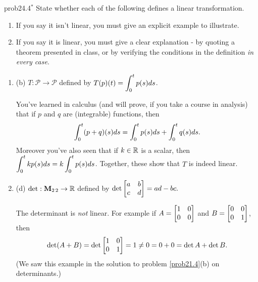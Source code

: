 \begin{sol}{prob24.4}$^\ast$ State whether each of the following defines a linear transformation.    
   \smallskip    
\begin{enumerate}[$\bullet$]
\item If you say it isn't linear, you must give an explicit example to illustrate.   
\item If you say it is linear, you must give a clear explanation -   by quoting a theorem presented in class, or by verifying the conditions in the definition {\it  in every  case}. 
\end{enumerate}
 \medskip
\begin{enumerate}[ ]
 
\item (b) $T: \mathcal P \to \mathcal P$ defined by $T(p)(t)=\displaystyle \int_0^tp(s) ds$.

\soln You've learned in calculus (and will prove, if you take a course in analysis) that if $p$ and $q$ are (integrable) functions, then $$\displaystyle \int_0^t(p+q)(s) ds= \displaystyle \int_0^tp(s) ds+ \displaystyle \int_0^tq(s) ds.$$ Moreover you've also seen that if $k\in \mathbb{R}$ is a scalar, then $\displaystyle \int_0^t kp(s) ds=\displaystyle k\int_0^tp(s) ds$. Together, these show that $T$ is indeed linear.
\medskip 
 
\item (d) $\det: \mathbf{M}_{2\,2} \to \mathbb{R}$ defined by $\det \bmatrix a&b\\c&d\endbmatrix = ad-bc.$

\soln The determinant is {\it not} linear. For example if $A=\bmatrix 1&0\cr0&0\endbmatrix$ and $B=\bmatrix 0&0\cr0&1\endbmatrix$, then $$\det(A+B)=\det \bmatrix 1&0\cr0&1\endbmatrix =1 \not= 0=0+0= \det A + \det B.$$ (We saw this example in the solution to problem \ref{prob21.4}(b)  on determinants.)
\medskip 
\end{enumerate}
\end{sol}